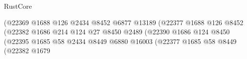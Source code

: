 \begin{lexlean}{RustCore}
\begin{coremodule}
                                                              (@22369
                                                                @1688
                                                                @126
                                                                @2434
                                                                @8452
                                                                @6877
                                                                @13189
                                                                (@22377
                                                                  @1688
                                                                  @126
                                                                  @8452
                                                                  (@22382
                                                                    @1686
                                                                    @214
                                                                    @124
                                                                    @27
                                                                    @8450
                                                                    @2489
                                                                    (@22390
                                                                      @1686
                                                                      @124
                                                                      @8450
                                                                      (@22395
                                                                        @1685
                                                                        @58
                                                                        @2434
                                                                        @8449
                                                                        @6880
                                                                        @16003
                                                                        (@22377
                                                                          @1685
                                                                          @58
                                                                          @8449
                                                                          (@22382
                                                                            @1679

\end{coremodule}
\end{lexlean}
